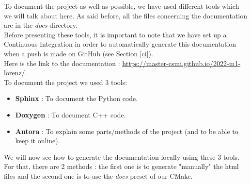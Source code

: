 	To document the project as well as possible, we have used different tools which we will talk about here. As said before, all the files concerning the documentation are in the \textit{docs} directory. \\
	Before presenting these tools, it is important to note that we have set up a Continuous Integration in order to automatically generate this documentation when a push is made on GitHub (see Section \ref{ci}). \\
	Here is the link to the documentation : \url{https://master-csmi.github.io/2022-m1-lorenz/}. \\
	To document the project we used 3 tools:
	\begin{itemize}[label=-]
		\item \textbf{Sphinx\cite{sphinx_doc}} : To document the Python code. 
		\item \textbf{Doxygen\cite{doxygen_doc}} : To document C++ code.
		\item \textbf{Antora\cite{antora_doc}} : To explain some parts/methods of the project (and to be able to keep it online).
	\end{itemize}
	We will now see how to generate the documentation locally using these 3 tools. For that, there are 2 methods : the first one is to generate "manually" the html files and the second one is to use the \textit{docs} preset of our CMake.
